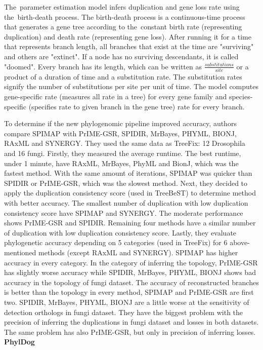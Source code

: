 The~parameter estimation model \cite{spimap} infers duplication and gene loss rate using the~birth-death process. The birth-death process is a continuous-time process that generates a gene tree according to the~constant birth rate (representing duplication) and death rate (representing gene loss). After running it for a time that represents branch length, all branches that exist at the time are "surviving" and others are "extinct". If a node has no surviving descendants, it is called "doomed". Every branch has its length, which can be written as  \( \frac{substitutions}{site} \) or a product of a duration of time and a substitution rate. The substitution rates signify the number of substitutions per site per unit of time. The model computes gene-specific rate (measures all rate in a tree) for every gene family and species-specific (specifies rate to given branch in the gene tree) rate for every branch.

To determine if the new phylogenomic pipeline improved accuracy, authors compare SPIMAP with PrIME-GSR, SPIDIR, MrBayes, PHYML, BIONJ, RAxML and SYNERGY. They used the same data as TreeFix: 12 Drosophila and 16 fungi. Firstly, they measured the average runtime. The best runtime, under 1 minute, have RAxML, MrBayes, PhyML and BionJ, which was the fastest method. With the same amount of iterations, SPIMAP was quicker than SPIDIR or PrIME-GSR, which was the slowest method. Next, they decided to apply the duplication consistency score (used in TreeBeST) to determine method with better accuracy. The smallest number of duplication with low duplication consistency score have SPIMAP and SYNERGY. The moderate performance shows PrIME-GSR and SPIDIR. Remaining four methods have a similar number of duplication with low duplication consistency score. Lastly, they evaluate phylogenetic accuracy depending on 5 categories (used in TreeFix) for 6 above-mentioned methods (except RAxML and SYNERGY). SPIMAP has higher accuracy in every category. In the category of inferring the topology, PrIME-GSR has slightly worse accuracy while SPIDIR, MrBayes, PHYML, BIONJ shows bad accuracy in the topology of fungi dataset. The accuracy of reconstructed branches is better than the topology in every method, SPIMAP and PrIME-GSR are first two. SPIDIR, MrBayes, PHYML, BIONJ are a little worse at the sensitivity of detection orthologs in fungi dataset. They have the biggest problem with the precision of inferring the duplications in fungi dataset and losses in both datasets. The same problem has also PrIME-GSR, but only in precision of inferring losses.\\
\textbf{PhylDog}

